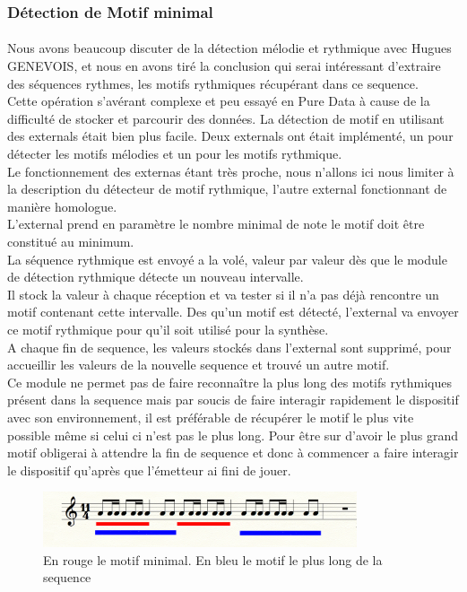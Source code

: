\documentclass[a4paper, titlepage, oneside, 12pt]{article}%
\begin{document}
\subsubsection{Détection de Motif minimal}
\paragraph{}
Nous avons beaucoup discuter de la détection mélodie et rythmique avec Hugues GENEVOIS, et nous en avons tiré la conclusion qui serai intéressant d'extraire des séquences rythmes, les motifs rythmiques récupérant dans ce sequence.\\
Cette opération s’avérant complexe et peu essayé en Pure Data à cause de la difficulté de stocker et parcourir des données. La détection de motif en utilisant des externals était bien plus facile. Deux externals ont était implémenté, un pour détecter les motifs mélodies et un pour les motifs rythmique.\\
Le fonctionnement des externas étant très proche, nous n'allons ici nous limiter à la description du détecteur de motif rythmique, l'autre external fonctionnant de manière homologue.\\
L'external prend en paramètre le nombre minimal de note le motif doit être constitué au minimum.\\
La séquence rythmique est envoyé a la volé, valeur par valeur dès que le module de détection rythmique détecte un nouveau intervalle.\\
Il stock la valeur à chaque réception et va tester si il n'a pas déjà rencontre un motif contenant cette intervalle. Des qu'un motif est détecté, l'external va envoyer ce motif rythmique pour qu'il soit utilisé pour la synthèse.\\
A chaque fin de sequence, les valeurs stockés dans l'external sont supprimé, pour accueillir les valeurs de la nouvelle sequence et trouvé un autre motif.\\
Ce module ne permet pas de faire reconnaître la plus long des motifs rythmiques présent dans la sequence mais par soucis  de faire interagir rapidement le dispositif avec son environnement, il est préférable de récupérer le motif le plus vite possible même si celui ci n'est pas le plus long. Pour être sur d'avoir le plus grand motif obligerai à attendre la fin de sequence et donc à commencer a faire interagir le dispositif qu'après que l'émetteur ai fini de jouer.
\begin{figure}[H]
	\centering
	\includegraphics[width=350px]{motifrythme.jpg}
	\caption{En rouge le motif minimal. En bleu le motif le plus long de la sequence}
\end{figure}
\end{document}
